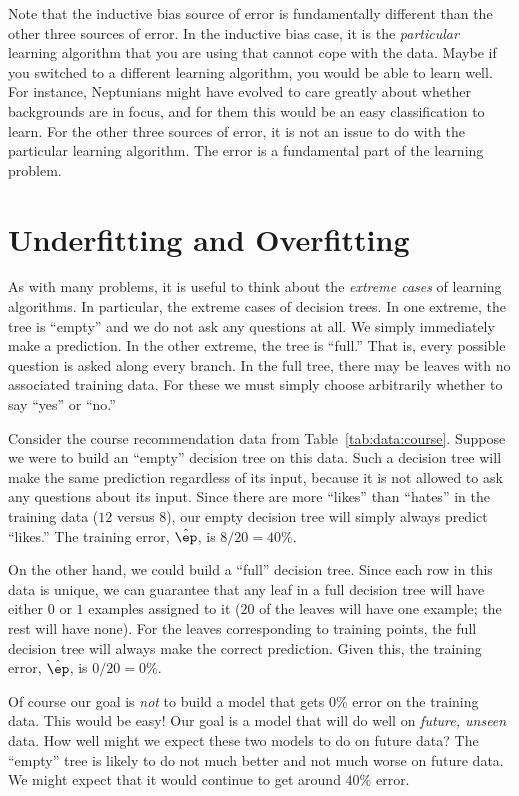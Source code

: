 Note that the inductive bias source of error is fundamentally
different than the other three sources of error.  In the inductive
bias case, it is the \emph{particular} learning algorithm that you are
using that cannot cope with the data.  Maybe if you switched to a
different learning algorithm, you would be able to learn well.  For
instance, Neptunians might have evolved to care greatly about whether
backgrounds are in focus, and for them this would be an easy
classification to learn.  For the other three sources of error, it is
not an issue to do with the particular learning algorithm.  The error
is a fundamental part of the learning problem.

\section{Underfitting and Overfitting}

As with many problems, it is useful to think about the \emph{extreme
  cases} of learning algorithms.  In particular, the extreme cases of
decision trees.  In one extreme, the tree is ``empty'' and we do not
ask any questions at all.  We simply immediately make a prediction.  In
the other extreme, the tree is ``full.''  That is, every possible
question is asked along every branch.  In the full tree, there may be
leaves with no associated training data.  For these we must simply
choose arbitrarily whether to say ``yes'' or ``no.''

Consider the course recommendation data from
Table~\ref{tab:data:course}.  Suppose we were to build an ``empty''
decision tree on this data.  Such a decision tree will make the same
prediction regardless of its input, because it is not allowed to ask
any questions about its input.  Since there are more ``likes'' than
``hates'' in the training data ($12$ versus $8$), our empty decision
tree will simply always predict ``likes.''  The training error, $\hat
\ep$, is $8/20 = 40\%$.

On the other hand, we could build a ``full'' decision tree.  Since
each row in this data is unique, we can guarantee that any leaf in a
full decision tree will have either $0$ or $1$ examples assigned to it
($20$ of the leaves will have one example; the rest will have none).
For the leaves corresponding to training points, the full decision
tree will always make the correct prediction.  
Given this, the training error, $\hat \ep$, is $0/20 = 0\%$.

Of course our goal is \emph{not} to build a model that gets $0\%$
error on the training data.  This would be easy!  Our goal is a model
that will do well on \emph{future, unseen} data.  How well might we
expect these two models to do on future data?  The ``empty'' tree is
likely to do not much better and not much worse on future data.  We
might expect that it would continue to get around $40\%$ error.

